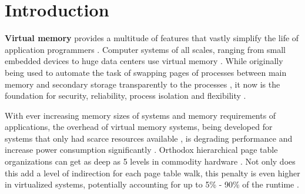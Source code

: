 \chapter{Introduction} %


















\textbf{Virtual memory} provides a multitude of features that vastly simplify the life of application programmers \cite{jacob1998virtualissues}. Computer systems of all scales, ranging from small embedded devices to huge data centers use virtual memory \cite{bhattacharjee2017architectural}.
While originally being used to automate the task of swapping pages of processes between main memory and secondary storage transparently to the processes \cite{jacob1998virtualissues}, it now is the foundation for security, reliability, process isolation and flexibility \cite{wales1999virtual,jacobVirtualMemoryContemporary1998}.

With ever increasing memory sizes of systems and memory requirements of applications, the overhead of virtual memory systems, being developed for systems that only had scarce resources available \cite{halbuer2023morsels}, is degrading performance and increase power consumption significantly \cite{zagieboylo2020cost}.
Orthodox hierarchical page table organizations \cite{tanenbaumOS} can get as deep as 5 levels in commodity hardware \cite{intel5LevelPaging5Level2017}. Not only does this add a level of indirection for each page table walk, this penalty is even higher in virtualized systems, potentially accounting for up to 5\% - 90\% of the runtime \cite{yaniv2016hash}.

